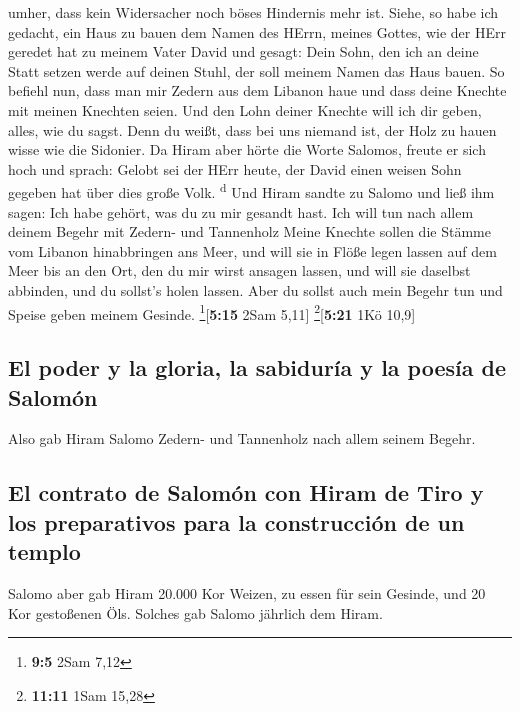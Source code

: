 umher, dass kein Widersacher noch böses Hindernis mehr ist.
 Siehe, so habe ich gedacht, ein Haus zu bauen dem Namen
des HErrn, meines Gottes, wie der HErr geredet hat zu meinem Vater David
und gesagt: Dein Sohn, den ich an deine Statt setzen werde auf deinen
Stuhl, der soll meinem Namen das Haus bauen.  So befiehl
nun, dass man mir Zedern aus dem Libanon haue und dass deine Knechte mit
meinen Knechten seien. Und den Lohn deiner Knechte will ich dir geben,
alles, wie du sagst. Denn du weißt, dass bei uns niemand ist, der Holz
zu hauen wisse wie die Sidonier.  Da Hiram aber hörte die
Worte Salomos, freute er sich hoch und sprach: Gelobt sei der HErr
heute, der David einen weisen Sohn gegeben hat über dies große Volk.
\textsuperscript{d}  Und Hiram sandte zu Salomo und ließ
ihm sagen: Ich habe gehört, was du zu mir gesandt hast. Ich will tun
nach allem deinem Begehr mit Zedern- und Tannenholz 
Meine Knechte sollen die Stämme vom Libanon hinabbringen ans Meer, und
will sie in Flöße legen lassen auf dem Meer bis an den Ort, den du mir
wirst ansagen lassen, und will sie daselbst abbinden, und du sollst's
holen lassen. Aber du sollst auch mein Begehr tun und Speise geben
meinem Gesinde. \footnote{\textbf{9:5} 2Sam 7,12}{[}\textbf{5:15} 2Sam
5,11{]} \footnote{\textbf{11:11} 1Sam 15,28}{[}\textbf{5:21} 1Kö 10,9{]}

\hypertarget{el-poder-y-la-gloria-la-sabiduruxeda-y-la-poesuxeda-de-salomuxf3n}{%
\subsection{El poder y la gloria, la sabiduría y la poesía de
Salomón}\label{el-poder-y-la-gloria-la-sabiduruxeda-y-la-poesuxeda-de-salomuxf3n}}

 Also gab Hiram Salomo Zedern- und Tannenholz nach allem
seinem Begehr.

\hypertarget{el-contrato-de-salomuxf3n-con-hiram-de-tiro-y-los-preparativos-para-la-construcciuxf3n-de-un-templo}{%
\subsection{El contrato de Salomón con Hiram de Tiro y los preparativos
para la construcción de un
templo}\label{el-contrato-de-salomuxf3n-con-hiram-de-tiro-y-los-preparativos-para-la-construcciuxf3n-de-un-templo}}

 Salomo aber gab Hiram 20.000 Kor Weizen, zu essen für
sein Gesinde, und 20 Kor gestoßenen Öls. Solches gab Salomo jährlich dem
Hiram.

